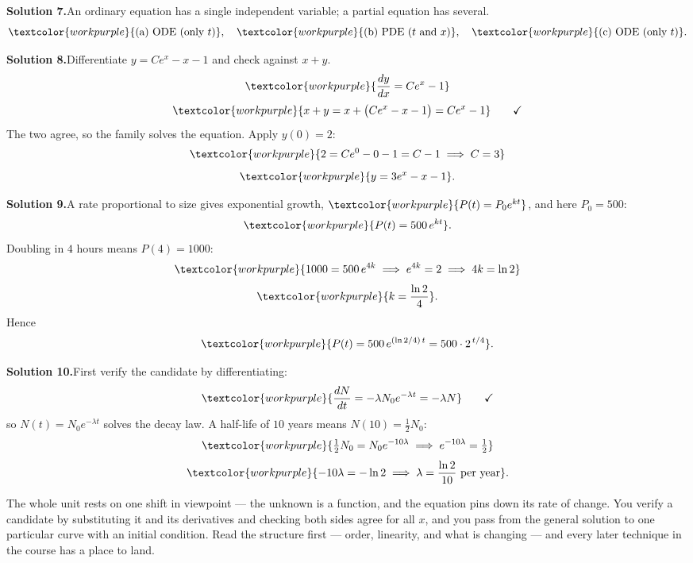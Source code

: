 \medskip
\noindent\textbf{Solution 7.}\quad An ordinary equation has a single independent
variable; a partial equation has several.
\[ \textcolor{workpurple}{\text{(a) ODE (only } t)}, \quad
   \textcolor{workpurple}{\text{(b) PDE (}t \text{ and } x)}, \quad
   \textcolor{workpurple}{\text{(c) ODE (only } t)}. \]

\medskip
\noindent\textbf{Solution 8.}\quad Differentiate $y = Ce^{x} - x - 1$ and check
against $x + y$.
\[ \textcolor{workpurple}{\frac{dy}{dx} = Ce^{x} - 1} \]
\[ \textcolor{workpurple}{x + y = x + \big(Ce^{x} - x - 1\big) = Ce^{x} - 1} \qquad\checkmark \]
The two agree, so the family solves the equation. Apply $y(0) = 2$:
\[ \textcolor{workpurple}{2 = Ce^{0} - 0 - 1 = C - 1 \;\Longrightarrow\; C = 3} \]
\[ \textcolor{workpurple}{y = 3e^{x} - x - 1}. \]

\medskip
\noindent\textbf{Solution 9.}\quad A rate proportional to size gives exponential
growth, $\textcolor{workpurple}{P(t) = P_{0}e^{kt}}$, and here $P_{0} = 500$:
\[ \textcolor{workpurple}{P(t) = 500\,e^{kt}}. \]
Doubling in $4$ hours means $P(4) = 1000$:
\[ \textcolor{workpurple}{1000 = 500\,e^{4k} \;\Longrightarrow\; e^{4k} = 2 \;\Longrightarrow\; 4k = \ln 2} \]
\[ \textcolor{workpurple}{k = \frac{\ln 2}{4}}. \]
Hence
\[ \textcolor{workpurple}{P(t) = 500\,e^{(\ln 2 / 4)\,t} = 500\cdot 2^{\,t/4}}. \]

\medskip
\noindent\textbf{Solution 10.}\quad First verify the candidate by
differentiating:
\[ \textcolor{workpurple}{\frac{dN}{dt} = -\lambda N_{0}e^{-\lambda t} = -\lambda N} \qquad\checkmark \]
so $N(t) = N_{0}e^{-\lambda t}$ solves the decay law. A half-life of $10$ years
means $N(10) = \tfrac{1}{2}N_{0}$:
\[ \textcolor{workpurple}{\tfrac{1}{2}N_{0} = N_{0}e^{-10\lambda} \;\Longrightarrow\; e^{-10\lambda} = \tfrac{1}{2}} \]
\[ \textcolor{workpurple}{-10\lambda = -\ln 2 \;\Longrightarrow\; \lambda = \frac{\ln 2}{10} \text{ per year}}. \]

\vspace{0.8em}
\begin{conceptbox}
The whole unit rests on one shift in viewpoint --- the unknown is a
\textcolor{accentorange}{function}, and the equation pins down its
\textcolor{accentorange}{rate of change}. You \textcolor{accentorange}{verify} a
candidate by substituting it and its derivatives and checking both sides agree
for all $x$, and you pass from the \textcolor{accentorange}{general solution} to
one particular curve with an \textcolor{accentorange}{initial condition}. Read
the structure first --- order, linearity, and what is changing --- and every
later technique in the course has a place to land.
\end{conceptbox}


